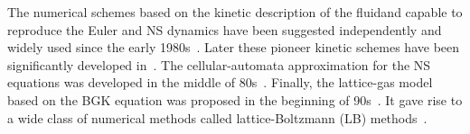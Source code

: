 \documentclass{elsarticle} %
\begin{document}

The numerical schemes based on the kinetic description of the fluidand capable to reproduce the Euler and NS dynamics
have been suggested independently and widely used since the early 1980s~\cite{Potkin1975, Pullin1980, Reitz1981, Aristov1983}.
Later these pioneer kinetic schemes have been significantly developed
in~\cite{Elizarova1985, Deshpande1986, Prendergast1993, Chou1997, Ohwada2004Xu, Ohwada2004Kobayashi, Ohwada2006}.
The cellular-automata approximation for the NS equations was developed in the middle of 80s~\cite{Frisch1986}.
Finally, the lattice-gas model based on the BGK equation was proposed in the beginning of 90s~\cite{Qian1992}.
It gave rise to a wide class of numerical methods called lattice-Boltzmann (LB) methods~\cite{Higuera1989, Benzi1992, Succi2001}.
\end{document}
